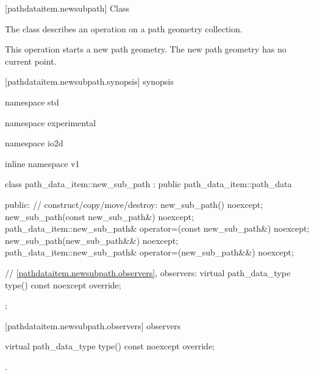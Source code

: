  [pathdataitem.newsubpath] {Class }

\pnum
{}
The class  describes an operation on a path geometry collection.

\pnum
This operation starts a new path geometry. The new path geometry has no current point.

 [pathdataitem.newsubpath.synopsis] { synopsis}

\begin{codeblock}
namespace std { namespace experimental { namespace io2d { inline namespace v1 {
  class path_data_item::new_sub_path : public path_data_item::path_data {
  public:
    // construct/copy/move/destroy:
    new_sub_path() noexcept;
    new_sub_path(const new_sub_path&) noexcept;
    path_data_item::new_sub_path& operator=(const new_sub_path&) noexcept;
    new_sub_path(new_sub_path&&) noexcept;
    path_data_item::new_sub_path& operator=(new_sub_path&&) noexcept;

    // \ref{pathdataitem.newsubpath.observers}, observers:
    virtual path_data_type type() const noexcept override;
  };
} } } }
\end{codeblock}

 [pathdataitem.newsubpath.observers]{ observers}

\begin{itemdecl}
    virtual path_data_type type() const noexcept override;
\end{itemdecl}
\begin{itemdescr}
	\pnum
	\returns
	.

\end{itemdescr}
